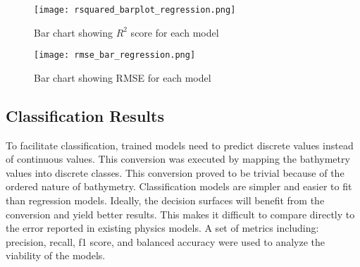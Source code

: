 \begin{figure}[h]
    \centering
    \texttt{[image: rsquared\_barplot\_regression.png]}
    \caption{Bar chart showing \(R^2\) score for each model}
    \label{fig:r2_barplot_regression}
\end{figure}

\begin{figure}[h]
    \centering
    \texttt{[image: rmse\_bar\_regression.png]} 
    \caption{Bar chart showing RMSE for each model}
    \label{fig:rmse_barplot_regression}
\end{figure}


\subsection{Classification Results}
\setlength{\parindent}{10ex}
To facilitate classification, trained models need to predict discrete values instead of continuous values.
This conversion was executed by mapping the bathymetry values into discrete classes.
This conversion proved to be trivial because of the ordered nature of bathymetry.
Classification models are simpler and easier to fit than regression models.
Ideally, the decision surfaces will benefit from the conversion and yield better results.
This makes it difficult to compare directly to the error reported in existing physics models.
A set of metrics including: precision, recall, f1 score, and balanced accuracy were used to analyze the viability of the models.

